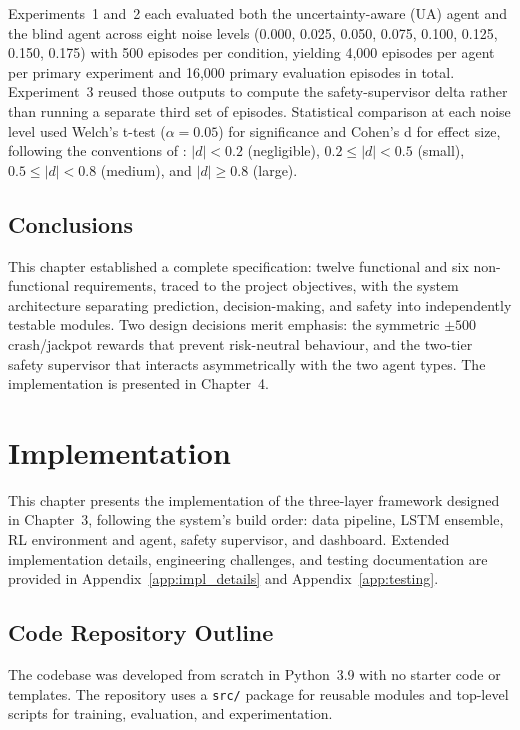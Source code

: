 \documentclass[12pt,a4paper]{report}
\begin{document}
Experiments~1 and~2 each evaluated both the uncertainty-aware (UA) agent and the blind agent across eight noise levels (0.000, 0.025, 0.050, 0.075, 0.100, 0.125, 0.150, 0.175) with 500 episodes per condition, yielding 4,000 episodes per agent per primary experiment and 16,000 primary evaluation episodes in total. Experiment~3 reused those outputs to compute the safety-supervisor delta rather than running a separate third set of episodes. Statistical comparison at each noise level used Welch's t-test ($\alpha = 0.05$) for significance and Cohen's d for effect size, following the conventions of \citet{cohen1988statistical}: $|d| < 0.2$ (negligible), $0.2 \leq |d| < 0.5$ (small), $0.5 \leq |d| < 0.8$ (medium), and $|d| \geq 0.8$ (large).

\section{Conclusions}

This chapter established a complete specification: twelve functional and six non-functional requirements, traced to the project objectives, with the system architecture separating prediction, decision-making, and safety into independently testable modules. Two design decisions merit emphasis: the symmetric $\pm 500$ crash/jackpot rewards that prevent risk-neutral behaviour, and the two-tier safety supervisor that interacts asymmetrically with the two agent types. The implementation is presented in Chapter~4.



\chapter{Implementation}

This chapter presents the implementation of the three-layer framework designed in Chapter~3, following the system's build order: data pipeline, LSTM ensemble, RL environment and agent, safety supervisor, and dashboard. Extended implementation details, engineering challenges, and testing documentation are provided in Appendix~\ref{app:impl_details} and Appendix~\ref{app:testing}.

\section{Code Repository Outline}

The codebase was developed from scratch in Python~3.9 with no starter code or templates. The repository uses a \texttt{src/} package for reusable modules and top-level scripts for training, evaluation, and experimentation.
\end{document}

